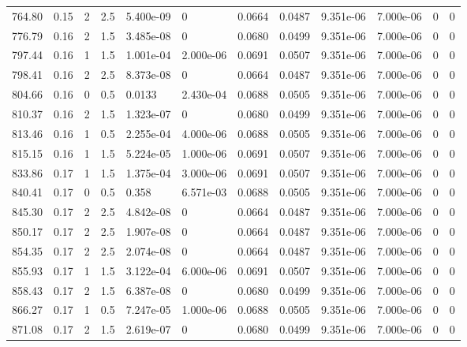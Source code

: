 \documentclass[preview]{standalone}
\begin{document}
{{{\begin{tabular}{L{1.2cm}C{1.2cm} C{0.3cm}C{0.5cm} C{1.4cm}C{1.4cm} C{1.4cm}C{1.4cm} C{1.6cm}C{1.6cm} C{1.6cm}C{1.6cm}}
  764.80  &  0.15  & 2     & 2.5 &  5.400e-09  & 0  &  0.0664&   0.0487& 9.351e-06 & 7.000e-06   &  0 & 0  \\ 
  776.79  &  0.16  & 2     & 1.5 &  3.485e-08  & 0  &  0.0680&   0.0499& 9.351e-06 & 7.000e-06   &  0 & 0  \\ 
  797.44  &  0.16  & 1     & 1.5 &  1.001e-04  & 2.000e-06  &  0.0691&   0.0507& 9.351e-06 & 7.000e-06   &  0 & 0  \\ 
  798.41  &  0.16  & 2     & 2.5 &  8.373e-08  & 0  &  0.0664&   0.0487& 9.351e-06 & 7.000e-06   &  0 & 0  \\ 
  804.66  &  0.16  & 0     & 0.5 &  0.0133  & 2.430e-04  &  0.0688&   0.0505& 9.351e-06 & 7.000e-06   &  0 & 0  \\ 
  810.37  &  0.16  & 2     & 1.5 &  1.323e-07  & 0  &  0.0680&   0.0499& 9.351e-06 & 7.000e-06   &  0 & 0  \\ 
  813.46  &  0.16  & 1     & 0.5 &  2.255e-04  & 4.000e-06  &  0.0688&   0.0505& 9.351e-06 & 7.000e-06   &  0 & 0  \\ 
  815.15  &  0.16  & 1     & 1.5 &  5.224e-05  & 1.000e-06  &  0.0691&   0.0507& 9.351e-06 & 7.000e-06   &  0 & 0  \\ 
  833.86  &  0.17  & 1     & 1.5 &  1.375e-04  & 3.000e-06  &  0.0691&   0.0507& 9.351e-06 & 7.000e-06   &  0 & 0  \\ 
  840.41  &  0.17  & 0     & 0.5 &  0.358  & 6.571e-03  &  0.0688&   0.0505& 9.351e-06 & 7.000e-06   &  0 & 0  \\ 
  845.30  &  0.17  & 2     & 2.5 &  4.842e-08  & 0  &  0.0664&   0.0487& 9.351e-06 & 7.000e-06   &  0 & 0  \\ 
  850.17  &  0.17  & 2     & 2.5 &  1.907e-08  & 0  &  0.0664&   0.0487& 9.351e-06 & 7.000e-06   &  0 & 0  \\ 
  854.35  &  0.17  & 2     & 2.5 &  2.074e-08  & 0  &  0.0664&   0.0487& 9.351e-06 & 7.000e-06   &  0 & 0  \\ 
  855.93  &  0.17  & 1     & 1.5 &  3.122e-04  & 6.000e-06  &  0.0691&   0.0507& 9.351e-06 & 7.000e-06   &  0 & 0  \\ 
  858.43  &  0.17  & 2     & 1.5 &  6.387e-08  & 0  &  0.0680&   0.0499& 9.351e-06 & 7.000e-06   &  0 & 0  \\ 
  866.27  &  0.17  & 1     & 0.5 &  7.247e-05  & 1.000e-06  &  0.0688&   0.0505& 9.351e-06 & 7.000e-06   &  0 & 0  \\ 
  871.08  &  0.17  & 2     & 1.5 &  2.619e-07  & 0  &  0.0680&   0.0499& 9.351e-06 & 7.000e-06   &  0 & 0  \\ 

\end{tabular}}}}
\end{document}

